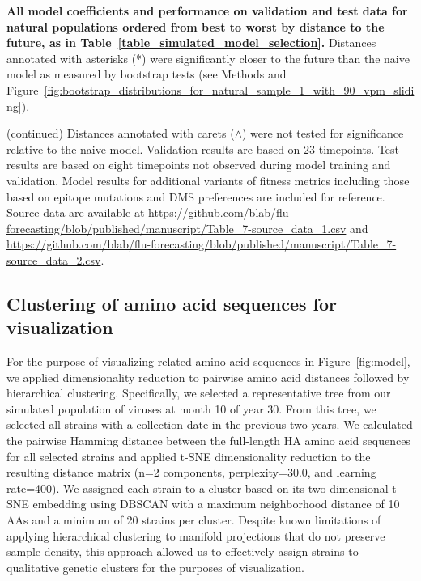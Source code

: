 \begin{table}
  \begin{center}
    \scalebox{0.85}{
        
    }
    \caption[{All model coefficients and performance on validation and test data for natural populations ordered from best to worst by distance to the future, as in Table~\ref{table_simulated_model_selection}.}]{
      {\bf All model coefficients and performance on validation and test data for natural populations ordered from best to worst by distance to the future, as in Table~\ref{table_simulated_model_selection}.}
      Distances annotated with asterisks (*) were significantly closer to the future than the naive model as measured by bootstrap tests (see Methods and Figure~\ref{fig:bootstrap_distributions_for_natural_sample_1_with_90_vpm_sliding}).
    }
    \label{table:complete_natural_model_selection}
  \end{center}

\end{table}

\begin{table}\ContinuedFloat
  \caption[{}]{(continued)
    Distances annotated with carets ($\wedge$) were not tested for significance relative to the naive model.
    Validation results are based on 23 timepoints.
    Test results are based on eight timepoints not observed during model training and validation.
    Model results for additional variants of fitness metrics including those based on epitope mutations and DMS preferences are included for reference.
    Source data are available at \url{https://github.com/blab/flu-forecasting/blob/published/manuscript/Table_7-source_data_1.csv} and \url{https://github.com/blab/flu-forecasting/blob/published/manuscript/Table_7-source_data_2.csv}.
  }
\end{table}

\subsection{Clustering of amino acid sequences for visualization}

For the purpose of visualizing related amino acid sequences in Figure~\ref{fig:model}, we applied dimensionality reduction to pairwise amino acid distances followed by hierarchical clustering.
Specifically, we selected a representative tree from our simulated population of viruses at month 10 of year 30.
From this tree, we selected all strains with a collection date in the previous two years.
We calculated the pairwise Hamming distance between the full-length HA amino acid sequences for all selected strains and applied t-SNE dimensionality reduction \citep{vanDerMaaten2008} to the resulting distance matrix (n=2 components, perplexity=30.0, and learning rate=400).
We assigned each strain to a cluster based on its two-dimensional t-SNE embedding using DBSCAN \citep{Ester1996} with a maximum neighborhood distance of 10 AAs and a minimum of 20 strains per cluster.
Despite known limitations of applying hierarchical clustering to manifold projections that do not preserve sample density, this approach allowed us to effectively assign strains to qualitative genetic clusters for the purposes of visualization.

